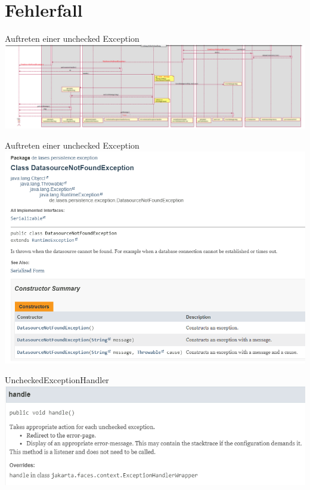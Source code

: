 \documentclass{beamer}
\begin{document}
    \section{Fehlerfall}
    \begin{frame}{Auftreten einer unchecked Exception}
        \centering
        \includegraphics[height=0.4\textheight]{graphics/exc/seq_ex}
    \end{frame}
    \begin{frame}{Auftreten einer unchecked Exception}
        \centering
        \includegraphics[height=0.6\textheight]{graphics/exc/doc_ex}
    \end{frame}
    \begin{frame}{UncheckedExceptionHandler}
        \centering
        \includegraphics[height=0.4\textheight]{graphics/exc/doc_handle}
    \end{frame}
\end{document}

